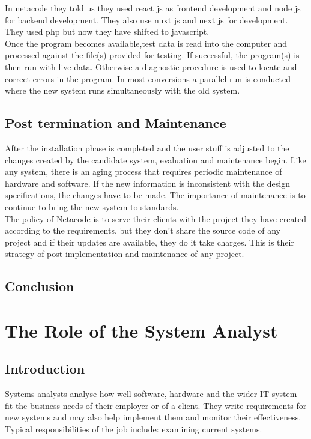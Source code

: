 \documentclass[a4paper,12pt]{report}
\begin{document}
In netacode they told us they used  react js as frontend development and node js for backend development. They also use nuxt js and next js for development. They used php but now they have shifted to javascript. \\

Once the program becomes available,test data is read into the computer and  processed against the file(s) provided for testing. If successful, the program(s) is then run with live data. Otherwise  a diagnostic procedure is used to locate and correct errors in the program. In most conversions a parallel run is conducted where the new system runs simultaneously with the old system. 
\section{Post termination and Maintenance }
After the installation phase is completed and the user stuff is adjusted to the changes created by the candidate system, evaluation and  maintenance begin. Like any system, there is an aging process that requires periodic maintenance of hardware and software. If the new information is inconsistent with the design specifications, the changes have to be made. The importance of maintenance is to continue to bring the new system to standards.\\ 

The policy of Netacode is to serve their clients with the project they have created according to the requirements. but they don't share the source code of any project and if their updates are available, they do it take charges. This is their strategy of post implementation and maintenance of any project.
\section{Conclusion}








\newpage
\chapter{The Role of the System Analyst}
\section{Introduction}
Systems analysts analyse how well software, hardware and the wider IT system fit the business needs of their employer or of a client. They write requirements for new systems and may also help implement them and monitor their effectiveness. Typical responsibilities of the job include: examining current systems.
\end{document}
